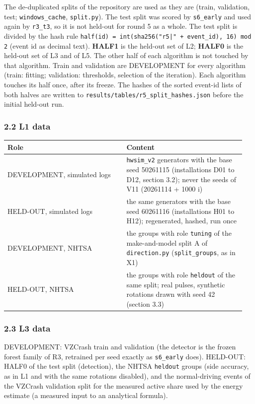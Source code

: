 The de-duplicated splits of the repository are used as they are (train, validation, test; \texttt{windows\_cache}, \texttt{split.py}). The test split was scored by \texttt{s6\_early} and used again by \texttt{r3\_t3}, so it is not held-out for round 5 as a whole. The test split is divided by the hash rule \texttt{half(id) = int(sha256("r5|" + event\_id), 16) mod 2} (event id as decimal text). \textbf{HALF1} is the held-out set of L2; \textbf{HALF0} is the held-out set of L3 and of L5. The other half of each algorithm is not touched by that algorithm. Train and validation are DEVELOPMENT for every algorithm (train: fitting; validation: thresholds, selection of the iteration). Each algorithm touches its half once, after its freeze. The hashes of the sorted event-id lists of both halves are written to \texttt{results/tables/r5\_split\_hashes.json} before the initial held-out run.

\subsubsection*{2.2 L1 data}

{\scriptsize\raggedright
\begin{longtable}{p{0.475\linewidth}p{0.475\linewidth}}
\toprule
Role & Content \\
\midrule
\endhead
DEVELOPMENT, simulated logs & \texttt{hwsim\_v2} generators with the base seed 50261115 (installations D01 to D12, section 3.2); never the seeds of V11 (20261114 + 1000 i) \\
HELD-OUT, simulated logs & the same generators with the base seed 60261116 (installations H01 to H12); regenerated, hashed, run once \\
DEVELOPMENT, NHTSA & the groups with role \texttt{tuning} of the make-and-model split A of \texttt{direction.py} (\texttt{split\_groups}, as in X1) \\
HELD-OUT, NHTSA & the groups with role \texttt{heldout} of the same split; real pulses, synthetic rotations drawn with seed 42 (section 3.3) \\
\bottomrule
\end{longtable}}

\subsubsection*{2.3 L3 data}

DEVELOPMENT: VZCrash train and validation (the detector is the frozen forest family of R3, retrained per seed exactly as \texttt{s6\_early} does). HELD-OUT: HALF0 of the test split (detection), the NHTSA \texttt{heldout} groups (side accuracy, as in L1 and with the same rotations disabled), and the normal-driving events of the VZCrash validation split for the measured active share used by the energy estimate (a measured input to an analytical formula).


